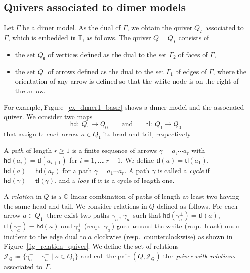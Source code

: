 \documentclass[pdftex]{sigma}
\numberwithin{equation}{section}
\theoremstyle{definition}
\newcommand{\CC}{\mathbb{C}}
\newcommand{\TT}{\mathbb{T}}
\newcommand{\calJ}{\mathcal{J}}
\newcommand{\hd}{\mathsf{hd}}
\newcommand{\tl}{\mathsf{tl}}
\begin{document}
\subsection{Quivers associated to dimer models}\label{subsec_quiver}

Let $\Gamma$ be a dimer model.
As the dual of $\Gamma$, we obtain the quiver $Q_\Gamma$ associated to $\Gamma$, which is embedded in $\TT$, as follows.
The quiver $Q=Q_\Gamma$ consists of
\begin{itemize}\itemsep=0pt
\item the set $Q_0$ of vertices defined as the dual to the set $\Gamma_2$ of faces of $\Gamma$,
\item the set $Q_1$ of arrows defined as the dual to the set $\Gamma_1$ of edges of $\Gamma$, where the orientation of any arrow is defined so that the white node is on the right of the arrow.
\end{itemize}
For example, Figure~\ref{ex_dimer1_basic} shows a dimer model and the associated quiver.
We consider two maps
\[
\hd \colon \ Q_1\to Q_0 \qquad \text{and}\qquad \tl \colon \ Q_1\to Q_0
\]
that assign to each arrow $a\in Q_1$ its head and tail, respectively.

A \emph{path} of length $r\ge 1$ is a finite sequence of arrows $\gamma=a_1\cdots a_r$ with $\hd(a_i)=\tl(a_{i+1})$ for $i=1, \dots, r-1$.
We define $\tl(a)=\tl(a_1)$, $\hd(a)=\hd(a_r)$ for a path $\gamma=a_1\cdots a_r$.
A path $\gamma$ is called a \emph{cycle} if $\hd(\gamma)=\tl(\gamma)$, and a \emph{loop} if it is a cycle of length one.

A \emph{relation} in $Q$ is a $\CC$-linear combination of paths of length at least two having the same head and tail.
We consider relations in $Q$ defined as follows.
For each arrow $a\in Q_1$, there exist two paths $\gamma_a^+$, $\gamma_a^-$ such that $\hd(\gamma_a^\pm)=\tl(a)$, $\tl(\gamma_a^\pm)=\hd(a)$ and
$\gamma_a^+$ (resp.\ $\gamma_a^-$) goes around the white (resp.\ black) node incident to the edge dual to $a$ clockwise (resp.\ counterclockwise) as shown in Figure~\ref{fig_relation_quiver}.
We define the set of relations $\calJ_Q\coloneqq \{\gamma_a^+-\gamma_a^- \mid a\in Q_1\}$ and
call the pair $(Q,\calJ_Q)$ the \emph{quiver with relations} associated to~$\Gamma$.
\end{document}
